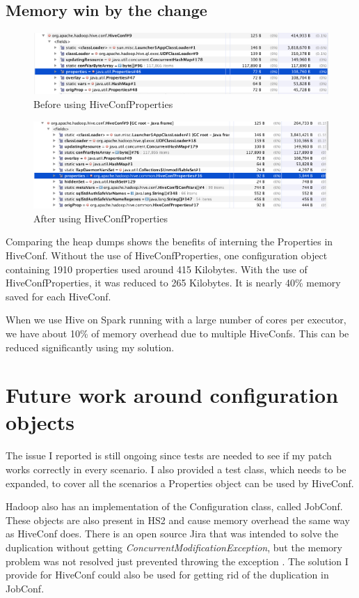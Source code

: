 \subsection{Memory win by the change}
\begin{figure}[H]
	\includegraphics[width=150mm, keepaspectratio]{figures/hiveconf_orig.png}
	\centering
	\caption{Before using HiveConfProperties}
\end{figure}

\begin{figure}[H]
	\includegraphics[width=150mm, keepaspectratio]{figures/hiveconf_interned.png}
	\centering
	\caption{After using HiveConfProperties}
\end{figure}

Comparing the heap dumps shows the benefits of interning the Properties in HiveConf. Without the use of HiveConfProperties, one configuration object containing 1910 properties used around 415 Kilobytes. With the use of HiveConfProperties, it was reduced to 265 Kilobytes. It is nearly 40\% memory saved for each HiveConf. 

When we use Hive on Spark running with a large number of cores per executor, we have about 10\% of memory overhead due to multiple HiveConfs. This can be reduced significantly using my solution. 

\section{Future work around configuration objects}
The issue I reported is still ongoing since tests are needed to see if my patch works correctly in every scenario. I also provided a test class, which needs to be expanded, to cover all the scenarios a Properties object can be used by HiveConf. 

Hadoop also has an implementation of the Configuration class, called JobConf. These objects are also present in HS2 and cause memory overhead the same way as HiveConf does. There is an open source Jira that was intended to solve the duplication without getting \textit{ConcurrentModificationException}, but the memory problem was not resolved just prevented throwing the exception \cite{hive-jobconf}. The solution I provide for HiveConf could also be used for getting rid of the duplication in JobConf.